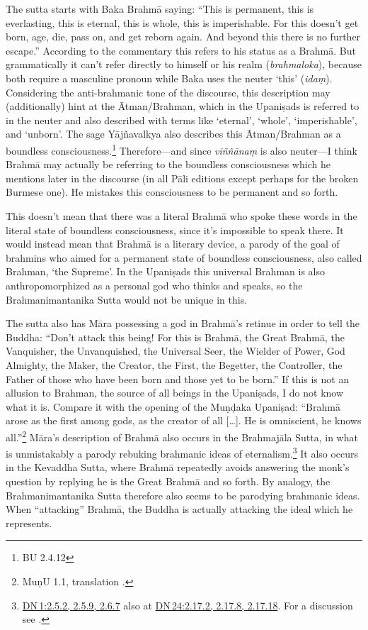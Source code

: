 \documentclass[10pt, openright]{book}
\begin{document}
The sutta starts with Baka Brahmā saying: “This is permanent, this is everlasting, this is eternal, this is whole, this is imperishable. For this doesn’t get born, age, die, pass on, and get reborn again. And beyond this there is no further escape.” According to the commentary this refers to his status as a Brahmā. But grammatically it can’t refer directly to himself or his realm (\textit{brahma­loka}), because both require a masculine pronoun while Baka uses the neuter ‘this’ (\textit{idaṃ}). Considering the anti-brahmanic tone of the discourse, this description may (additionally) hint at the Ātman/Brahman, which in the Upaniṣads is referred to in the neuter and also described with terms like ‘eternal’, ‘whole’, ‘imperishable’, and ‘unborn’. The sage Yājñavalkya also describes this Ātman/Brahman as a boundless consciousness.\footnote {BU 2.4.12} Therefore—and since \textit{viññānaṃ} is also neuter—I think Brahmā may actually be referring to the boundless consciousness which he mentions later in the discourse (in all Pāli editions except perhaps for the broken Burmese one). He mistakes this consciousness to be permanent and so forth.


This doesn’t mean that there was a literal Brahmā who spoke these words in the literal state of boundless consciousness, since it’s impossible to speak there. It would instead mean that Brahmā is a literary device, a parody of the goal of brahmins who aimed for a permanent state of boundless consciousness, also called Brahman, ‘the Supreme’. In the Upaniṣads this universal Brahman is also anthropomorphized as a personal god who thinks and speaks, so the Brahmanimantanika Sutta would not be unique in this.


The sutta also has Māra possessing a god in Brahmā’s retinue in order to tell the Buddha: “Don’t attack this being! For this is Brahmā, the Great Brahmā, the Vanquisher, the Unvanquished, the Universal Seer, the Wielder of Power, God Almighty, the Maker, the Creator, the First, the Begetter, the Controller, the Father of those who have been born and those yet to be born.” If this is not an allusion to Brahman, the source of all beings in the Upaniṣads, I do not know what it is. Compare it with the opening of the Muṇḍaka Upaniṣad: “Brahmā arose as the first among gods, as the creator of all […]. He is omniscient, he knows all.”\footnote {MuṇU 1.1, translation \cite{Olivelle}.} Māra’s description of Brahmā also occurs in the Brahmajāla Sutta, in what is unmistakably a parody rebuking brahmanic ideas of eternalism.\footnote {\href{https://suttacentral.net/dn1/en/sujato\#2.5.2}{DN 1:2.5.2, 2.5.9, 2.6.7} also at \href{https://suttacentral.net/dn24/en/sujato\#2.17.2}{DN 24:2.17.2, 2.17.8, 2.17.18}. For a discussion see \cite{Sunyo 2023}.} It also occurs in the Kevaddha Sutta, where Brahmā repeatedly avoids answering the monk’s question by replying he is the Great Brahmā and so forth. By analogy, the Brahmanimantanika Sutta therefore also seems to be parodying brahmanic ideas. When “attacking” Brahmā, the Buddha is actually attacking the ideal which he represents.
\end{document}
